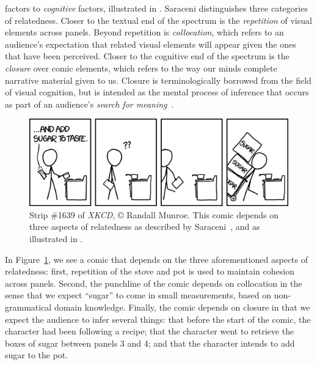 factors to \emph{cognitive} factors, illustrated in .
%
Saraceni distinguishes three categories of relatedness.
Closer to the textual end of the spectrum is the \emph{repetition} of visual
elements across panels. Beyond repetition is \emph{collocation}, which refers
to an audience's expectation that related visual elements will appear given the
ones that have been perceived. Closer to the cognitive end of the spectrum is
the \emph{closure} over comic elements, which refers to the way our minds 
complete narrative material given to us. Closure is terminologically borrowed 
from the field of visual cognition, but is intended as the mental process 
of inference that occurs as part of an audience's 
\emph{search for meaning}~\cite{gerrig1994readers}.

%
\begin{figure}[t]
	\includegraphics[width=\columnwidth]{xkcd-to_taste.png}
	\caption{
		Strip \#1639 of {\em XKCD}, {\small\copyright} Randall Munroe. This comic
		depends on three aspects of relatedness as described by 
                Saraceni~\cite{saraceni2016relatedness}, and as illustrated in 
		.
	}
\label{fig:xkcd}
\end{figure}
In Figure~\ref{fig:xkcd}, we see a comic that depends on the three aforementioned 
aspects of relatedness: first, repetition of the stove and pot is used to maintain
cohesion across panels. Second, the punchline of the comic depends on
collocation in the sense that we expect ``sugar'' to come in small
measurements, based on non-grammatical domain knowledge.  Finally, the
comic depends on closure in that we expect the audience to infer several
things: that before the start of the comic, the character had been
following a recipe; that the character went to retrieve the boxes of sugar
between panels 3 and 4; and that the character intends to add sugar to the
pot.

%
%
%

